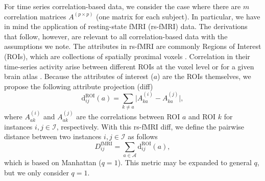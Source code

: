 \documentclass[10pt,letterpaper]{article}
\begin{document}
For time series correlation-based data, we consider the case where there are $m$ correlation matrices $A^{(p \times p)}$ (one matrix for each subject). In particular, we have in mind the application of resting-state fMRI (rs-fMRI) data. The derivations that follow, however, are relevant to all correlation-based data with the assumptions we note. The attributes in rs-fMRI are commonly Regions of Interest (ROIs), which are collections of spatially proximal voxels \cite{lee2013}. Correlation in their time-series activity arise between different ROIs at the voxel level or for a given brain atlas \cite{dickie2017}. Because the attributes of interest ($a$) are the ROIs themselves, we propose the following attribute projection (diff)
%
\begin{equation}\label{eq:diff_rs-fMRI}
\text{d}^\text{ROI}_{ij}(a) = \sum_{k \neq a}\bigl|A^{(i)}_{ka} - A^{(j)}_{ka}\bigr|,
\end{equation}
%
where $A^{(i)}_{ak}$ and $A^{(j)}_{ak}$ are the correlations between ROI $a$ and ROI $k$ for instances $i,j \in \mathcal{I}$, respectively. With this rs-fMRI diff, we define the pairwise distance between two instances $i,j \in \mathcal{I}$ as follows
%
\begin{equation}\label{eq:D_rs-fMRI}
D^\text{fMRI}_{ij} = \sum_{a \in \mathcal{A}} \text{d}^\text{ROI}_{ij}(a),
\end{equation}
%
which is based on Manhattan ($q=1$). This metric may be expanded to general $q$, but we only consider $q=1$.
\end{document}
